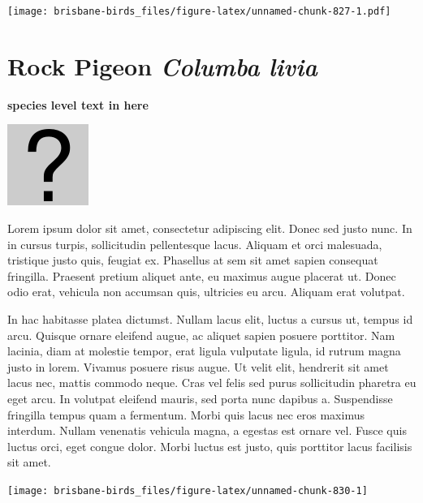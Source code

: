 \documentclass[]{book}
\let\origfigure\figure
\let\endorigfigure\endfigure
\renewenvironment{figure}[1][2] {
  \expandafter\origfigure\expandafter[H]
} {
  \endorigfigure
}
\begin{document}
\begin{figure}
\centering
\texttt{[image: brisbane-birds\_files/figure-latex/unnamed-chunk-827-1.pdf]}
\caption{\label{fig:unnamed-chunk-827}insert figure caption}
\end{figure}

\section{\texorpdfstring{Rock Pigeon \emph{Columba
livia}}{Rock Pigeon Columba livia}}\label{rock-pigeon-columba-livia}

\textbf{species level text in here}

\begin{figure}
\centering
\includegraphics{assets/missing.png}
\caption{No image for species}
\end{figure}

Lorem ipsum dolor sit amet, consectetur adipiscing elit. Donec sed justo
nunc. In in cursus turpis, sollicitudin pellentesque lacus. Aliquam et
orci malesuada, tristique justo quis, feugiat ex. Phasellus at sem sit
amet sapien consequat fringilla. Praesent pretium aliquet ante, eu
maximus augue placerat ut. Donec odio erat, vehicula non accumsan quis,
ultricies eu arcu. Aliquam erat volutpat.

In hac habitasse platea dictumst. Nullam lacus elit, luctus a cursus ut,
tempus id arcu. Quisque ornare eleifend augue, ac aliquet sapien posuere
porttitor. Nam lacinia, diam at molestie tempor, erat ligula vulputate
ligula, id rutrum magna justo in lorem. Vivamus posuere risus augue. Ut
velit elit, hendrerit sit amet lacus nec, mattis commodo neque. Cras vel
felis sed purus sollicitudin pharetra eu eget arcu. In volutpat eleifend
mauris, sed porta nunc dapibus a. Suspendisse fringilla tempus quam a
fermentum. Morbi quis lacus nec eros maximus interdum. Nullam venenatis
vehicula magna, a egestas est ornare vel. Fusce quis luctus orci, eget
congue dolor. Morbi luctus est justo, quis porttitor lacus facilisis sit
amet.

\begin{figure}
\texttt{[image: brisbane-birds\_files/figure-latex/unnamed-chunk-830-1]} \caption{insert figure caption}\label{fig:unnamed-chunk-830}
\end{figure}
\end{document}
